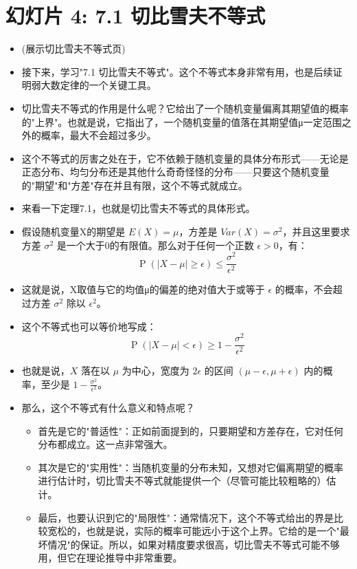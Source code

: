\documentclass[UTF8]{article} %
\DeclareMathOperator{\Prob}{\operatorname{P}}
\begin{document}
\section*{幻灯片 4: 7.1 切比雪夫不等式}
\begin{itemize}
    \itemsep1em
    \item (展示切比雪夫不等式页)
    \item 接下来，学习"7.1 切比雪夫不等式"。这个不等式本身非常有用，也是后续证明弱大数定律的一个关键工具。
    \item 切比雪夫不等式的作用是什么呢？它给出了一个随机变量偏离其期望值的概率的"上界"。也就是说，它指出了，一个随机变量的值落在其期望值μ一定范围之外的概率，最大不会超过多少。
    \item 这个不等式的厉害之处在于，它不依赖于随机变量的具体分布形式——无论是正态分布、均匀分布还是其他什么奇奇怪怪的分布——只要这个随机变量的"期望"和"方差"存在并且有限，这个不等式就成立。
    \item 来看一下定理7.1，也就是切比雪夫不等式的具体形式。
    \item 假设随机变量X的期望是 $E(X) = \mu$，方差是 $Var(X) = \sigma^2$，并且这里要求方差 $\sigma^2$ 是一个大于0的有限值。那么对于任何一个正数 $\epsilon > 0$，有：
    \[ \Prob(|X - \mu| \geq \epsilon) \leq \frac{\sigma^2}{\epsilon^2} \]
    \item 这就是说，X取值与它的均值μ的偏差的绝对值大于或等于 $\epsilon$ 的概率，不会超过方差 $\sigma^2$ 除以 $\epsilon^2$。
    \item 这个不等式也可以等价地写成：
    \[ \Prob(|X - \mu| < \epsilon) \geq 1 - \frac{\sigma^2}{\epsilon^2} \]
    \item 也就是说，$X$ 落在以 $\mu$ 为中心，宽度为 $2\epsilon$ 的区间 $(\mu-\epsilon, \mu+\epsilon)$ 内的概率，至少是 $1 - \frac{\sigma^2}{\epsilon^2}$。
    \item 那么，这个不等式有什么意义和特点呢？
    \begin{itemize}[label=\textbullet, itemsep=0.5em]
        \item 首先是它的"普适性"：正如前面提到的，只要期望和方差存在，它对任何分布都成立。这一点非常强大。
        \item 其次是它的"实用性"：当随机变量的分布未知，又想对它偏离期望的概率进行估计时，切比雪夫不等式就能提供一个（尽管可能比较粗略的）估计。
        \item 最后，也要认识到它的"局限性"：通常情况下，这个不等式给出的界是比较宽松的，也就是说，实际的概率可能远小于这个上界。它给的是一个"最坏情况"的保证。所以，如果对精度要求很高，切比雪夫不等式可能不够用，但它在理论推导中非常重要。
    \end{itemize}
\end{itemize}
\end{document}
